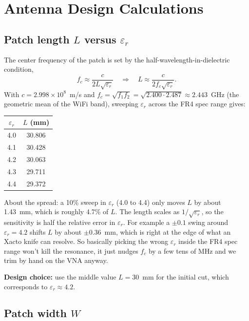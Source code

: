 \documentclass[11pt,letterpaper]{article}
\begin{document}
\section{Antenna Design Calculations}

\subsection*{Patch length \texorpdfstring{$L$}{L} versus \texorpdfstring{$\varepsilon_r$}{epsilon\_r}}

The center frequency of the patch is set by the half-wavelength-in-dielectric condition,
\[
f_c \approx \frac{c}{2L\sqrt{\varepsilon_r}} \quad\Longrightarrow\quad L \approx \frac{c}{2 f_c \sqrt{\varepsilon_r}}.
\]
With $c = 2.998\times10^{8}$~m/s and $f_c = \sqrt{f_1 f_2} = \sqrt{2.400 \cdot 2.487} \approx 2.443$~GHz (the geometric mean of the WiFi band), sweeping $\varepsilon_r$ across the FR4 spec range gives:

\begin{center}
\begin{tabular}{cc}
\toprule
$\varepsilon_r$ & $L$ (mm) \\
\midrule
4.0 & 30.806 \\
4.1 & 30.428 \\
4.2 & 30.063 \\
4.3 & 29.711 \\
4.4 & 29.372 \\
\bottomrule
\end{tabular}
\end{center}

About the spread: a 10\% sweep in $\varepsilon_r$ (4.0 to 4.4) only moves $L$ by about 1.43~mm, which is roughly 4.7\% of $L$. The length scales as $1/\sqrt{\varepsilon_r}$, so the sensitivity is half the relative error in $\varepsilon_r$. For example a $\pm 0.1$ swing around $\varepsilon_r = 4.2$ shifts $L$ by about $\pm 0.36$~mm, which is right at the edge of what an Xacto knife can resolve. So basically picking the wrong $\varepsilon_r$ inside the FR4 spec range won't kill the resonance, it just nudges $f_c$ by a few tens of MHz and we trim by hand on the VNA anyway.

\textbf{Design choice:} use the middle value $L = 30$~mm for the initial cut, which corresponds to $\varepsilon_r \approx 4.2$.

\subsection*{Patch width \texorpdfstring{$W$}{W}}
\end{document}
